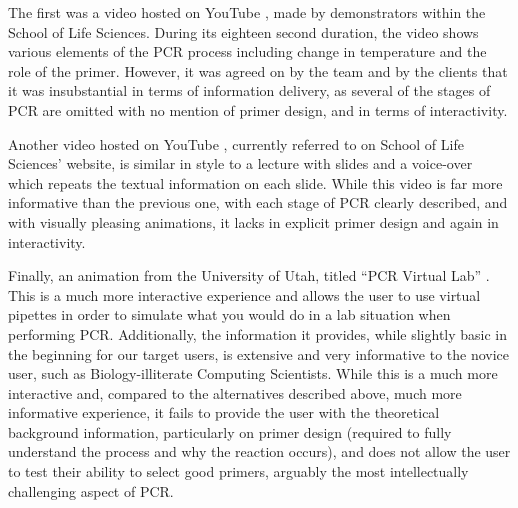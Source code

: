 The first was a video hosted on YouTube \cite{youtube:taqExtension},
made by demonstrators within the School of Life Sciences.
During its eighteen second duration, the video shows various elements
of the PCR process including change in temperature and the role of the
primer.
However, it was agreed on by the team and by the clients that it was
insubstantial in terms of information delivery, as several of the
stages of PCR are omitted with no mention of primer design, and in
terms of interactivity.

Another video hosted on YouTube \cite{youtube:PCR}, currently referred
to on School of Life Sciences' website, is similar in style to a
lecture with slides and a voice-over which repeats the textual
information on each slide.
While this video is far more informative than the previous one, with
each stage of PCR clearly described, and with visually pleasing
animations, it lacks in explicit primer design and again in
interactivity.

Finally, an animation from the University of Utah, titled ``PCR
Virtual Lab'' \cite{genScienceCenter2012}.
This is a much more interactive experience and allows the user to use
virtual pipettes in order to simulate what you would do in a lab
situation when performing PCR.
Additionally, the information it provides, while slightly basic in the
beginning for our target users, is extensive and very informative to
the novice user, such as Biology-illiterate Computing Scientists.
While this is a much more interactive and, compared to the
alternatives described above, much more informative experience, it
fails to provide the user with the theoretical background information,
particularly on primer design (required to fully understand the
process and why the reaction occurs), and does not allow the user to
test their ability to select good primers, arguably the most
intellectually challenging aspect of PCR.

